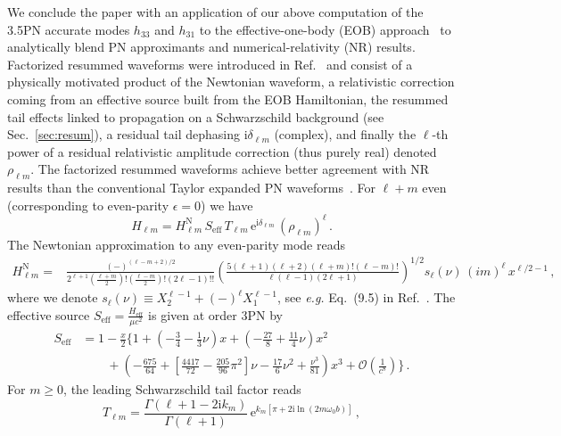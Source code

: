 \documentclass[prd,preprint,superscriptaddress,tightenlines,nofootinbib,
  eqsecnum,showpacs]{revtex4}
\newcommand{\ui}{\mathrm{i}}
\begin{document}
We conclude the paper with an application of our above computation of
the 3.5PN accurate modes $h_{33}$ and $h_{31}$ to the
effective-one-body (EOB) approach~\cite{BuonD99, DNorleans} to
analytically blend PN approximants and numerical-relativity (NR)
results. Factorized resummed waveforms were introduced in
Ref.~\cite{DIN09} and consist of a physically motivated product of the
Newtonian waveform, a relativistic correction coming from an effective
source built from the EOB Hamiltonian, the resummed tail effects
linked to propagation on a Schwarzschild background (see
Sec.~\ref{sec:resum}), a residual tail dephasing $\ui \delta_{\ell m}$
(complex), and finally the $\ell$-th power of a residual relativistic
amplitude correction (thus purely real) denoted $\rho_{\ell m}$. The
factorized resummed waveforms achieve better agreement with NR results
than the conventional Taylor expanded PN waveforms~\cite{DIN09, DN09,
  Buon09, FI10}. For $\ell + m$ even (corresponding to even-parity
$\epsilon=0$) we have
%
\begin{equation}\label{factor}
H_{\ell m} = H_{\ell m}^\text{N}\,S_\text{eff}\,T_{\ell m}\,\mathrm{e}^{\ui
  \delta_{\ell m}}\,\left(\rho_{\ell m}\right)^\ell\,.
\end{equation}
%
The Newtonian approximation to any even-parity mode reads
%
\begin{align}\label{HlmN}
H_{\ell m}^\text{N} =& \frac{(-)^{(\ell-m+2)/2}}{2^{\ell+1}
  (\frac{\ell+m}{2})!  (\frac{\ell-m}{2})!(2\ell-1)!!}
\left(\frac{5(\ell+1)(\ell+2)(\ell+m)!(\ell-m)!}{\ell
  (\ell-1)(2\ell+1)}\right)^{1/2} \!\!s_\ell(\nu) \,(i m)^\ell
\,x^{\ell/2-1}\,,
\end{align}
% 
where we denote $s_\ell(\nu)\equiv X_2^{\ell-1}+(-)^\ell
X_1^{\ell-1}$, see \textit{e.g.} Eq.~(9.5) in Ref.~\cite{BFIS08}. The
effective source $S_\text{eff} = \frac{H_\text{eff}}{\mu c^2}$ is
given at order 3PN by
%
\begin{align}\label{Seff}
S_\text{eff} &= 1 -\frac{x}{2} \biggl\{ 1 +\left(-\frac{3}{4} -
\frac{1}{3}\nu\right) x + \left(-\frac{27}{8} + \frac{11}{4}\nu\right)
x^2 \nonumber \\ & \quad \quad + \left( -\frac{675}{64} +
\left[\frac{4417}{72} - \frac{205}{96}\pi^2 \right]\nu -
\frac{17}{6}\nu^2 + \frac{\nu^3}{81} \right) x^3 +
\mathcal{O}\left(\frac{1}{c^8}\right)\biggr\}\,.
\end{align}
%
For $m\geqslant 0$, the leading Schwarzschild tail factor reads
%
\begin{equation}\label{Tellm}
T_{\ell m} = \frac{\Gamma\left(\ell+1-2\ui
  k_m\right)}{\Gamma(\ell+1)}\,\mathrm{e}^{k_m\left[\pi +
    2\ui\ln\left(2m\omega_0 b\right)\right]}\,,
\end{equation}
\end{document}
